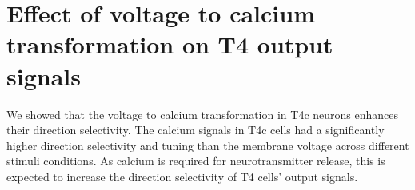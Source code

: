 \section{Effect of voltage to calcium transformation on T4 output signals}
We showed that the voltage to calcium transformation in T4c neurons enhances their direction selectivity. The calcium signals in T4c cells had a significantly higher direction selectivity and tuning than the membrane voltage across different stimuli conditions. As calcium is required for neurotransmitter release, this is expected to increase the direction selectivity of T4 cells' output signals. 

